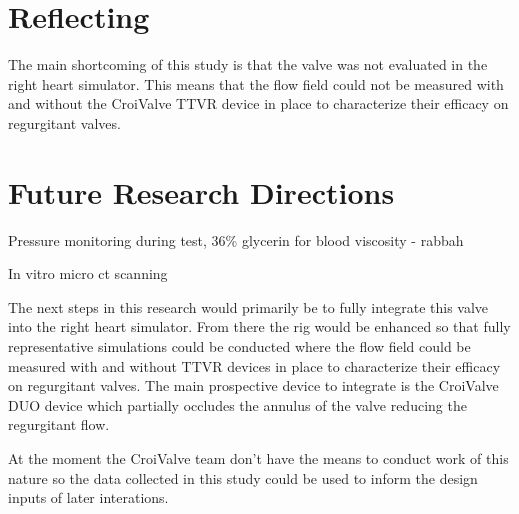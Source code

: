 \section{Reflecting}


The main shortcoming of this study is that the valve was not evaluated in the right heart simulator. This means that the flow field could not be measured with and without the CroiValve \gls{TTVR} device in place to characterize their efficacy on regurgitant valves.

\section{Future Research Directions}


Pressure monitoring during test, 36\% glycerin for blood viscosity - rabbah

In vitro micro ct scanning

The next steps in this research would primarily be to fully integrate this valve into the right heart simulator. From there the rig would be enhanced so that fully representative simulations could be conducted where the flow field could be measured with and without \gls{TTVR} devices in place to characterize their efficacy on regurgitant valves. The main prospective device to integrate is the CroiValve DUO device which partially occludes the annulus of the valve reducing the regurgitant flow.

At the moment the CroiValve team don't have the means to conduct work of this nature so the data collected in this study could be used to inform the design inputs of later interations.